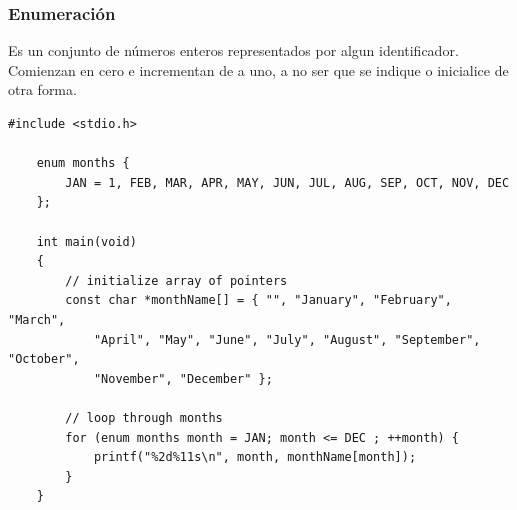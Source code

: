 \documentclass[10.5pt,scale=1.0,t,aspectratio=169,hyperref={pdfpagelabels=false}]{beamer}
\begin{document}
\begin{frame}[fragile]
	\frametitle{Enumeración}
	Es un conjunto de n\'umeros enteros representados por algun identificador. Comienzan en cero e incrementan de a uno, a no ser que se indique o inicialice de otra forma. 
	\begin{lstlisting}[style=CStyle,basicstyle=\tiny]
	#include <stdio.h>
	
	enum months {
		JAN = 1, FEB, MAR, APR, MAY, JUN, JUL, AUG, SEP, OCT, NOV, DEC
	};
	
	int main(void)
	{
		// initialize array of pointers
		const char *monthName[] = { "", "January", "February", "March",
			"April", "May", "June", "July", "August", "September", "October",
			"November", "December" };
		
		// loop through months
		for (enum months month = JAN; month <= DEC ; ++month) {
			printf("%2d%11s\n", month, monthName[month]);
		}
	}
	\end{lstlisting}
\end{frame}
\end{document}
